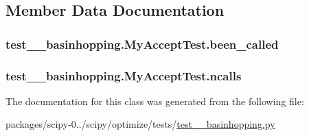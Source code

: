 \subsection{Member Data Documentation}
\hypertarget{classtest____basinhopping_1_1MyAcceptTest_a7fb60cfd3c07da67f1236fb54cac03f7}{}
\subsubsection[{been\+\_\+called}]{\setlength{\rightskip}{0pt plus 5cm}test\+\_\+\+\_\+basinhopping.\+My\+Accept\+Test.\+been\+\_\+called}\label{classtest____basinhopping_1_1MyAcceptTest_a7fb60cfd3c07da67f1236fb54cac03f7}
\hypertarget{classtest____basinhopping_1_1MyAcceptTest_ad2bc6f1ec8638071f9aa18cf3d3d7811}{}
\subsubsection[{ncalls}]{\setlength{\rightskip}{0pt plus 5cm}test\+\_\+\+\_\+basinhopping.\+My\+Accept\+Test.\+ncalls}\label{classtest____basinhopping_1_1MyAcceptTest_ad2bc6f1ec8638071f9aa18cf3d3d7811}


The documentation for this class was generated from the following file\+:\begin{DoxyCompactItemize}
\item 
packages/scipy-\/0../scipy/optimize/tests/\hyperlink{test____basinhopping_8py}{test\+\_\+\+\_\+basinhopping.\+py}\end{DoxyCompactItemize}
